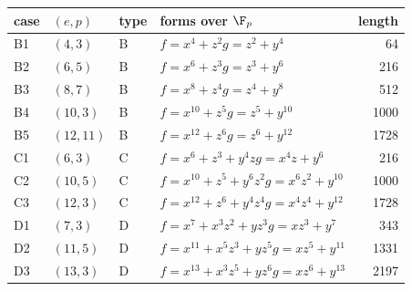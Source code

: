 \begin{tabular}{@{}lll>{\raggedright\arraybackslash}p{6.0cm}r@{}}
\toprule
case & $(e,p)$ & type & forms over $\F_p$ & length\\
\midrule
B1 & $(4,3)$ & B & $f=x^{4} + z^{2}$\newline $g=z^{2} + y^{4}$ & 64\\
B2 & $(6,5)$ & B & $f=x^{6} + z^{3}$\newline $g=z^{3} + y^{6}$ & 216\\
B3 & $(8,7)$ & B & $f=x^{8} + z^{4}$\newline $g=z^{4} + y^{8}$ & 512\\
B4 & $(10,3)$ & B & $f=x^{10} + z^{5}$\newline $g=z^{5} + y^{10}$ & 1000\\
B5 & $(12,11)$ & B & $f=x^{12} + z^{6}$\newline $g=z^{6} + y^{12}$ & 1728\\
C1 & $(6,3)$ & C & $f=x^{6} + z^{3} + y^{4}z$\newline $g=x^{4}z + y^{6}$ & 216\\
C2 & $(10,5)$ & C & $f=x^{10} + z^{5} + y^{6}z^{2}$\newline $g=x^{6}z^{2} + y^{10}$ & 1000\\
C3 & $(12,3)$ & C & $f=x^{12} + z^{6} + y^{4}z^{4}$\newline $g=x^{4}z^{4} + y^{12}$ & 1728\\
D1 & $(7,3)$ & D & $f=x^{7} + x^{3}z^{2} + yz^{3}$\newline $g=xz^{3} + y^{7}$ & 343\\
D2 & $(11,5)$ & D & $f=x^{11} + x^{5}z^{3} + yz^{5}$\newline $g=xz^{5} + y^{11}$ & 1331\\
D3 & $(13,3)$ & D & $f=x^{13} + x^{3}z^{5} + yz^{6}$\newline $g=xz^{6} + y^{13}$ & 2197\\
\bottomrule
\end{tabular}
